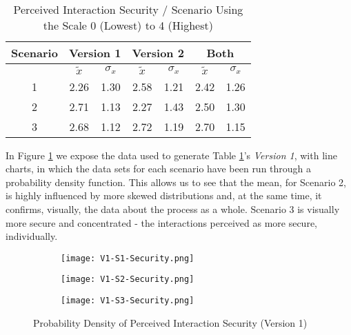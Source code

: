 \begin{table}[htb]
	\centering
	\caption{Perceived Interaction Security / Scenario Using the Scale 0 (Lowest) to 4 (Highest)}
	\label{tab: perceivedInteractionSecurity}
	\begin{tabular}{c|cc|cc|cc}
		\hline
		Scenario & \multicolumn{2}{c}{\bf Version 1} \vrule & \multicolumn{2}{c}{\bf Version 2} \vrule & \multicolumn{2}{c}{\bf Both}                                             \\
		\hline
		         & $\tilde{x}$                              & $\sigma_{x}$                             & $\tilde{x}$                  & $\sigma_{x}$ & $\tilde{x}$ & $\sigma_{x}$ \\
		\hline
		1        & 2.26                                     & 1.30                                     & 2.58                         & 1.21         & 2.42        & 1.26         \\
		\hline
		2        & 2.71                                     & 1.13                                     & 2.27                         & 1.43         & 2.50        & 1.30         \\
		\hline
		3        & 2.68                                     & 1.12                                     & 2.72                         & 1.19         & 2.70        & 1.15         \\
		\hline
	\end{tabular}
\end{table}

In Figure \ref{fig: perceivedInteractionSecurityOne} we expose the data used to generate Table \ref{tab: perceivedInteractionSecurity}'s \textit{Version 1}, with line charts, in which the data sets for each scenario have been run through a probability density function. This allows us to see that the mean, for Scenario 2, is highly influenced by more skewed distributions and, at the same time, it confirms, visually, the data about the process as a whole. Scenario 3 is visually more secure and concentrated - the interactions perceived as more secure, individually.

\begin{figure}[htb]
	\centering
	\begin{subfigure}[b]{0.49\textwidth}
		\centering
		\texttt{[image: V1-S1-Security.png]}
	\end{subfigure}
	\begin{subfigure}[b]{0.49\textwidth}
		\centering
		\texttt{[image: V1-S2-Security.png]}
	\end{subfigure}
	\hfill
	\begin{subfigure}[b]{0.49\textwidth}
		\centering
		\texttt{[image: V1-S3-Security.png]}
	\end{subfigure}

	\caption{Probability Density of Perceived Interaction Security (Version 1)}
	\label{fig: perceivedInteractionSecurityOne}
\end{figure}

